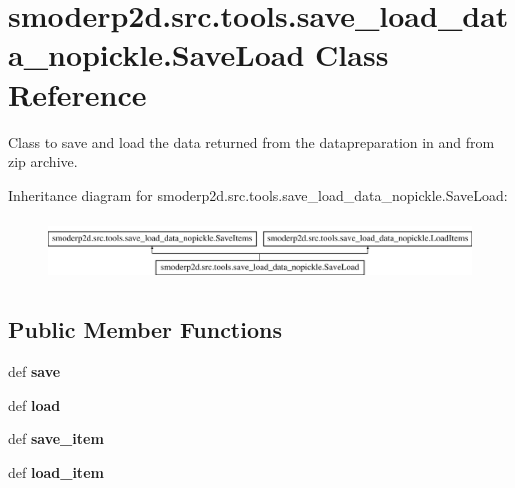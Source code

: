 \hypertarget{classsmoderp2d_1_1src_1_1tools_1_1save__load__data__nopickle_1_1SaveLoad}{\section{smoderp2d.\-src.\-tools.\-save\-\_\-load\-\_\-data\-\_\-nopickle.\-Save\-Load Class Reference}
\label{classsmoderp2d_1_1src_1_1tools_1_1save__load__data__nopickle_1_1SaveLoad}
}


Class to save and load the data returned from the datapreparation in and from zip archive.  


Inheritance diagram for smoderp2d.\-src.\-tools.\-save\-\_\-load\-\_\-data\-\_\-nopickle.\-Save\-Load\-:\begin{figure}[H]
\begin{center}
\leavevmode
\includegraphics[height=1.637427cm]{classsmoderp2d_1_1src_1_1tools_1_1save__load__data__nopickle_1_1SaveLoad}
\end{center}
\end{figure}
\subsection*{Public Member Functions}
\begin{DoxyCompactItemize}
\item 
\hypertarget{classsmoderp2d_1_1src_1_1tools_1_1save__load__data__nopickle_1_1SaveLoad_a31316039ba0bb03ae075194fa64cfa41}{def {\bfseries save}}\label{classsmoderp2d_1_1src_1_1tools_1_1save__load__data__nopickle_1_1SaveLoad_a31316039ba0bb03ae075194fa64cfa41}

\item 
\hypertarget{classsmoderp2d_1_1src_1_1tools_1_1save__load__data__nopickle_1_1SaveLoad_a5c3b185f5ac9e5906b49d6cac5b7e02a}{def {\bfseries load}}\label{classsmoderp2d_1_1src_1_1tools_1_1save__load__data__nopickle_1_1SaveLoad_a5c3b185f5ac9e5906b49d6cac5b7e02a}

\item 
\hypertarget{classsmoderp2d_1_1src_1_1tools_1_1save__load__data__nopickle_1_1SaveLoad_a4998bf25b098e24c409bbc0f26722964}{def {\bfseries save\-\_\-item}}\label{classsmoderp2d_1_1src_1_1tools_1_1save__load__data__nopickle_1_1SaveLoad_a4998bf25b098e24c409bbc0f26722964}

\item 
\hypertarget{classsmoderp2d_1_1src_1_1tools_1_1save__load__data__nopickle_1_1SaveLoad_a85f4c4638f570a6b276f58026a004ac9}{def {\bfseries load\-\_\-item}}\label{classsmoderp2d_1_1src_1_1tools_1_1save__load__data__nopickle_1_1SaveLoad_a85f4c4638f570a6b276f58026a004ac9}

\end{DoxyCompactItemize}
